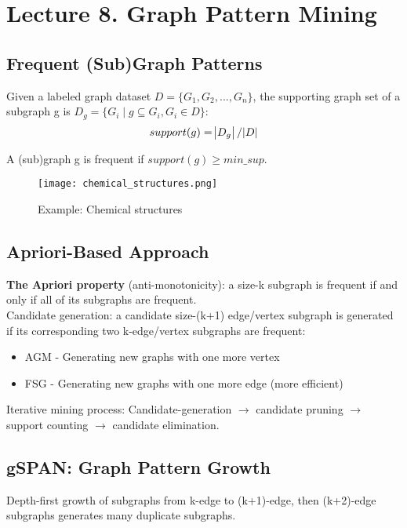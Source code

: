 \section{Lecture 8. Graph Pattern Mining}

\subsection{Frequent (Sub)Graph Patterns}
Given a labeled graph dataset $D = \{G_1, G_2, ..., G_n\}$, the supporting graph set of a subgraph g is $D_g = \{G_i \mid g \subseteq G_i, G_i \in D \}$:
\begin{equation*}
support(g) = \abs{D_g} / \abs{D}
\end{equation*}

A (sub)graph g is frequent if $support(g) \geqslant min\_sup$.

\begin{figure}[H]
    \centering
    \texttt{[image: chemical\_structures.png]}
    \caption{Example: Chemical structures}
\end{figure}

\subsection{Apriori-Based Approach}

\textbf{The Apriori property} (anti-monotonicity): a size-k subgraph is frequent if and only if all of its subgraphs are frequent.\\

Candidate generation: a candidate size-(k+1) edge/vertex subgraph is generated if its corresponding two k-edge/vertex subgraphs are frequent:
\begin{itemize}
\item AGM - Generating new graphs with one more vertex
\item FSG - Generating new graphs with one more edge (more efficient)
\end{itemize}

Iterative mining process: Candidate-generation $\to$ candidate pruning $\to$ support counting $\to$ candidate elimination.

\subsection{gSPAN: Graph Pattern Growth}
Depth-first growth of subgraphs from k-edge to (k+1)-edge, then (k+2)-edge subgraphs generates many duplicate subgraphs.\\

